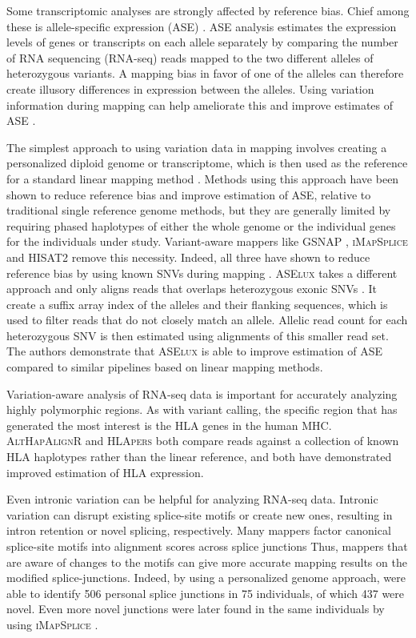 Some transcriptomic analyses are strongly affected by reference bias.
Chief among these is allele-specific expression (ASE) \cite{Degner2009-vw,stevenson2013sources,Castel2015-ef}.
ASE analysis estimates the expression levels of genes or transcripts on each allele separately by comparing the number of RNA sequencing (RNA-seq) reads mapped to the two different alleles of heterozygous variants.
A mapping bias in favor of one of the alleles can therefore create illusory differences in expression between the alleles.
Using variation information during mapping can help ameliorate this and improve estimates of ASE \cite{Castel2015-ef,Miao2018-ps}.

The simplest approach to using variation data in mapping involves creating a personalized diploid genome or transcriptome, which is then used as the reference for a standard linear mapping method \cite{Rozowsky_2011,Raghupathy2018-sd}.
Methods using this approach have been shown to reduce reference bias and improve estimation of ASE, relative to traditional single reference genome methods, but they are generally limited by requiring phased haplotypes of either the whole genome or the individual genes for the individuals under study.
Variant-aware mappers like \textsc{GSNAP} \cite{Wu2010-hv}, \textsc{iMapSplice} \cite{Liu_2018} and \textsc{HISAT2} \cite{Kim_2019} remove this necessity.
Indeed, all three have shown to reduce reference bias by using known SNVs during mapping \cite{Castel2015-ef,Liu_2018}.
\textsc{ASElux} takes a different approach and only aligns reads that overlaps heterozygous exonic SNVs \cite{Miao2018-ps}.
It create a suffix array index of the alleles and their flanking sequences, which is used to filter reads that do not closely match an allele.
Allelic read count for each heterozygous SNV is then estimated using alignments of this smaller read set.
The authors demonstrate that \textsc{ASElux} is able to improve estimation of ASE compared to similar pipelines based on linear mapping methods.

Variation-aware analysis of RNA-seq data is important for accurately analyzing highly polymorphic regions.
As with variant calling, the specific region that has generated the most interest is the HLA genes in the human MHC. 
\textsc{AltHapAlignR} \cite{Lee_2018} and \textsc{HLApers} \cite{Aguiar2019-fy} both compare reads against a collection of known HLA haplotypes rather than the linear reference, and both have demonstrated improved estimation of HLA expression.

Even intronic variation can be helpful for analyzing RNA-seq data. 
Intronic variation can disrupt existing splice-site motifs or create new ones, resulting in intron retention or novel splicing, respectively. 
Many mappers factor canonical splice-site motifs into alignment scores across splice junctions
Thus, mappers that are aware of changes to the motifs can give more accurate mapping results on the modified splice-junctions. 
Indeed, by using a personalized genome approach, \citeauthor{Stein_2015} \cite{Stein_2015} were able to identify 506 personal splice junctions in 75 individuals, of which 437 were novel.
Even more novel junctions were later found in the same individuals by \citeauthor{Liu_2018} using \textsc{iMapSplice} \cite{Liu_2018}.

